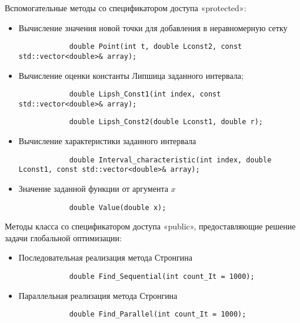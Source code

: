 \documentclass{report}
\begin{document}
	Вспомогательные методы со спецификатором доступа «protected»:\par
	\begin{itemize}	 
		\item Вычисление значения новой точки для добавления в неравномерную сетку \par
		\begin{lstlisting}
			double Point(int t, double Lconst2, const std::vector<double>& array);
		\end{lstlisting}\par
		\item Вычисление оценки константы Липшица заданного интервала; \par
		\begin{lstlisting}
			double Lipsh_Const1(int index, const std::vector<double>& array);
		\end{lstlisting}\par
		\begin{lstlisting}
			double Lipsh_Const2(double Lconst1, double r);
		\end{lstlisting}\par
		\item Вычисление характеристики заданного интервала \par
		\begin{lstlisting}
			double Interval_characteristic(int index, double Lconst1, const std::vector<double>& array);
		\end{lstlisting}\par
		\item Значение заданной функции от аргумента $x$ \par
		\begin{lstlisting}
			double Value(double x);
		\end{lstlisting}\par
	\end{itemize}
	
	Методы класса со спецификатором доступа «public», предоставляющие решение задачи глобальной оптимизации:\par
	\begin{itemize}
		\item Последовательная реализация метода Стронгина \par	
		\begin{lstlisting}
			double Find_Sequential(int count_It = 1000);
		\end{lstlisting}\par
		\item Параллельная реализация метода Стронгина \par	
		\begin{lstlisting}
			double Find_Parallel(int count_It = 1000);
		\end{lstlisting}\par
	\end{itemize}
	\newpage
	
\end{document}

